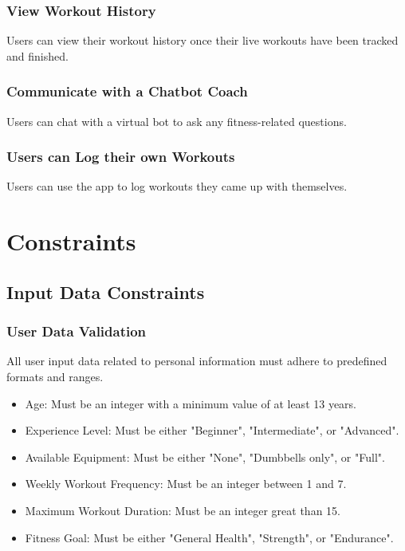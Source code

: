 \documentclass[12pt]{article}
\begin{document}
\subsubsection{View Workout History}
Users can view their workout history once their live workouts have been tracked and finished.

\subsubsection{Communicate with a Chatbot Coach}
Users can chat with a virtual bot to ask any fitness-related questions.

\subsubsection{Users can Log their own Workouts}
Users can use the app to log workouts they came up with themselves.

\section{Constraints}

\subsection{Input Data Constraints}

\subsubsection{User Data Validation}

All user input data related to personal information must adhere to predefined formats and ranges.

\begin{itemize}
  \item Age: Must be an integer with a minimum value of at least 13 years.
  \item Experience Level: Must be either "Beginner", "Intermediate", or "Advanced".
  \item Available Equipment: Must be either "None", "Dumbbells only", or "Full". 
  \item Weekly Workout Frequency: Must be an integer between 1 and 7.
  \item Maximum Workout Duration: Must be an integer great than 15. 
  \item Fitness Goal: Must be either "General Health", "Strength", or "Endurance". 
\end{itemize}
\end{document}

